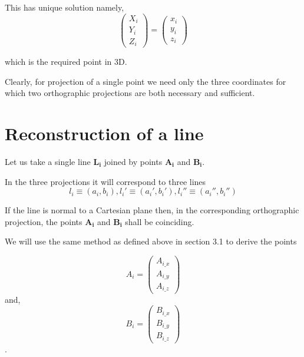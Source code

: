 \documentclass[a4paper,11pt,openany]{book}
\begin{document}
This has unique solution namely,
\begin{equation}
\left(\begin{array}{c} X_i \\ Y_i \\ Z_i \end{array}\right) =
\left(\begin{array}{c} x_i \\ y_i \\ z_i \end{array}\right)
\end{equation}

which is the required point in 3D.

Clearly, for projection of a single point we need only the three coordinates for which two orthographic projections are both necessary and sufficient.

\section{Reconstruction of a line}
Let us take a single line $\boldsymbol{L_i}$ joined by points $\boldsymbol{A_i}$ and $\boldsymbol{B_i}$.

\noindent In the three projections it will correspond to three lines 
\begin{equation}
l_i \equiv (a_i, b_i) , l_i' \equiv (a_i', b_i') , l_i'' \equiv (a_i'', b_i'')
\end{equation}

If the line is normal to a Cartesian plane then, in the corresponding orthographic projection, the points  $\boldsymbol{A_i}$ and $\boldsymbol{B_i}$ shall be coinciding.

We will use the same method as defined above in section 3.1 to derive the points

\begin{equation}
A_i =
\left(\begin{array}{c} A_{i\_x} \\ A_{i\_y} \\ A_{i\_z} \end{array}\right)
\end{equation}
and,
\begin{equation}
B_i =
\left(\begin{array}{c} B_{i\_x} \\ B_{i\_y} \\ B_{i\_z} \end{array}\right)
\end{equation}.
\end{document}
